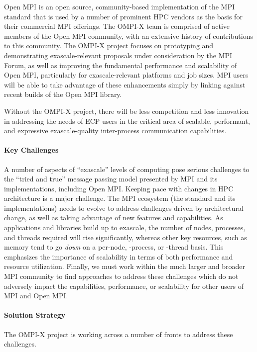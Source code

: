 Open MPI is an open source, community-based implementation of the MPI
standard that is
used by a number of prominent
HPC vendors as the basis for their commercial MPI offerings.  The
OMPI-X team is comprised of active members of the Open MPI community,
with an extensive history of contributions to this community.
The OMPI-X project focuses on prototyping
and demonstrating exascale-relevant proposals under consideration by
the MPI Forum, as well as improving the fundamental performance and
scalability of Open MPI, particularly for exascale-relevant platforms
and job sizes.  MPI users will be able to take advantage of these
enhancements simply by linking against recent builds of the Open MPI
library.

Without the OMPI-X project, there will be less competition and less
innovation in addressing the needs of ECP users in the critical area
of scalable, performant, and expressive exascale-quality inter-process
communication capabilities.

\paragraph{Key  Challenges}
A number of aspects of ``exascale'' levels
of computing pose serious challenges to the ``tried and true'' message
passing model presented by MPI and its implementations, including Open
MPI.
%
Keeping pace with changes in HPC architecture is a major challenge.
The MPI ecosystem (the standard and its implementations) needs to
evolve to address challenges
driven by
architectural change, as well as taking advantage of new features and
capabilities.
%
As applications and libraries
build up to exascale,
the number of nodes, processes, and
threads required will rise significantly, whereas other key resources,
such as memory tend to go \emph{down} on a per-node, -process, or
-thread basis.  This emphasizes the importance of scalability in terms
of both performance and resource utilization.
%
Finally, we must work within the much larger and broader MPI
community to find approaches to address these challenges which do not
adversely impact the capabilities, performance, or scalability for
other users of MPI and Open MPI.

\paragraph{Solution Strategy}
The OMPI-X project is working across a number of fronts to address
these challenges.

